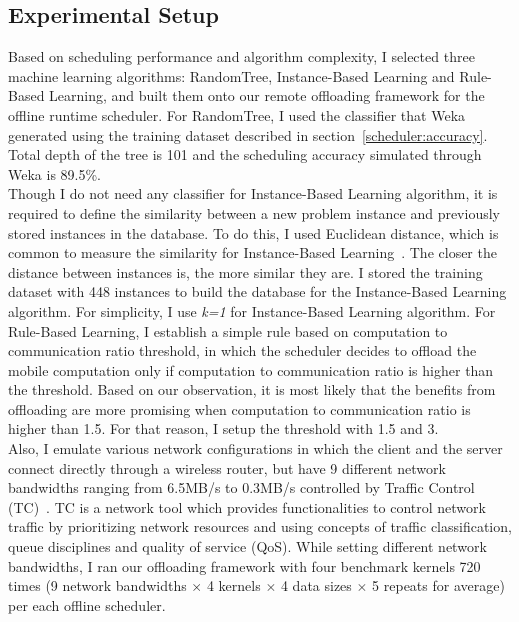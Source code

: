 \subsection{Experimental Setup}
\label{schedeulr:offline_setup}
%
Based on scheduling performance and algorithm complexity, I selected
three machine learning algorithms: RandomTree, Instance-Based Learning
and Rule-Based Learning, and built them onto our remote offloading
framework for the offline runtime scheduler.
%
For RandomTree, I used the classifier that Weka generated using the
training dataset described in section~\ref{scheduler:accuracy}.
%
Total depth of the tree is 101 and the scheduling accuracy simulated
through Weka is 89.5\%.\\
%
Though I do not need any classifier for Instance-Based Learning
algorithm, it is required to define the similarity between a new problem
instance and previously stored instances in the database.
%
To do this, I used Euclidean distance, which is common to measure the
similarity for Instance-Based Learning~\cite{instance}.
%
The closer the distance between instances is, the more similar 
they are.
%
I stored the training dataset with 448 instances to build the
database for the Instance-Based Learning algorithm.
%
For simplicity, I use {\it k=1} for Instance-Based Learning
algorithm.
%
For Rule-Based Learning, I establish a simple rule based on
computation to communication ratio threshold, in which the scheduler
decides to offload the mobile computation only if
computation to communication ratio is higher than the threshold.
%
Based on our observation, it is most likely that the benefits from
offloading are more promising when computation to communication ratio is
higher than 1.5.
%
For that reason, I setup the threshold with 1.5 and 3.\\
%
Also, I emulate various network configurations in which the
client and the server connect directly through a wireless router, but
have 9 different network bandwidths ranging from 6.5MB/s to 0.3MB/s
controlled by Traffic Control (TC)~\cite{tc}.
%
TC is a network tool which provides functionalities to control network
traffic by prioritizing network resources and using concepts of traffic
classification, queue disciplines and quality of service (QoS).
%
While setting different network bandwidths, I ran
our offloading framework with four benchmark kernels 720 times (9
network bandwidths $\times$ 4 kernels $\times$ 4 data sizes $\times$ 5
repeats for average) per each offline scheduler.
%

